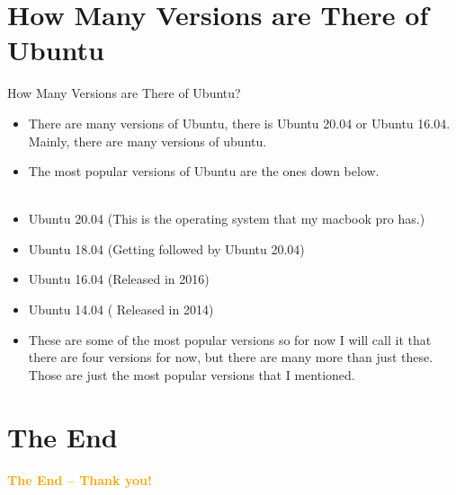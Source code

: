 \documentclass[aspectratio=43]{beamer}
\begin{document}
\section{How Many Versions are There of Ubuntu}
\begin{frame}{How Many Versions are There of Ubuntu?}
\begin{itemize}
\item There are many versions of Ubuntu, there is Ubuntu 20.04 or Ubuntu 16.04. Mainly, there are many versions of ubuntu.
\item The most popular versions of Ubuntu are the ones down below.
\\
~\\
\item Ubuntu 20.04 (This is the operating system that my macbook pro has.)
\item Ubuntu 18.04 (Getting followed by Ubuntu 20.04)
\item Ubuntu 16.04 (Released in 2016)
\item Ubuntu 14.04 ( Released in 2014)
\item These are some of the most popular versions so for now I will call it that there are four versions for now, but there are many more than just these. Those are just the most popular versions that I mentioned. 
\end{itemize}
\end{frame}


	
\section{The End}
    \begin{frame}{ }
        \centering
            \Huge\bfseries
        \textcolor{orange}{The End -- Thank you!}
    \end{frame}
\end{document}
